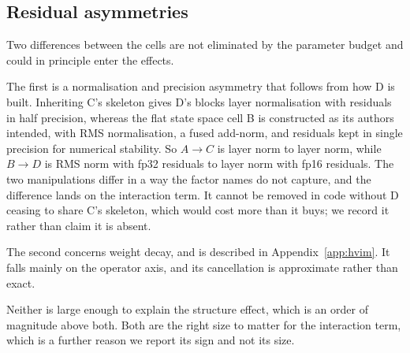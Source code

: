 \subsection{Residual asymmetries}

Two differences between the cells are not eliminated by the parameter budget
and could in principle enter the effects.

The first is a normalisation and precision asymmetry that follows from how D
is built. Inheriting C's skeleton gives D's blocks layer normalisation with
residuals in half precision, whereas the flat state space cell B is
constructed as its authors intended, with RMS normalisation, a fused
add-norm, and residuals kept in single precision for numerical stability.
So $A \to C$ is layer norm to layer norm, while $B \to D$ is RMS norm with
fp32 residuals to layer norm with fp16 residuals. The two manipulations
differ in a way the factor names do not capture, and the difference lands on
the interaction term. It cannot be removed in code without D ceasing to share
C's skeleton, which would cost more than it buys; we record it rather than
claim it is absent.

The second concerns weight decay, and is described in Appendix~\ref{app:hvim}.
It falls mainly on the operator axis, and its cancellation is approximate
rather than exact.

Neither is large enough to explain the structure effect, which is an order of
magnitude above both. Both are the right size to matter for the interaction
term, which is a further reason we report its sign and not its size.
